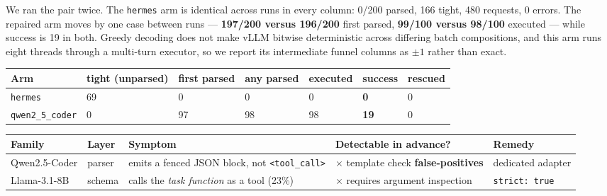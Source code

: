 We ran the pair twice. The \texttt{hermes} arm is identical across runs in every column: 0/200
parsed, 166 tight, 480 requests, 0 errors. The repaired arm moves by one case between runs ---
\textbf{197/200 versus 196/200} first parsed, \textbf{99/100 versus 98/100} executed --- while success is 19 in
both. Greedy decoding does not make vLLM bitwise deterministic across differing batch
compositions, and this arm runs eight threads through a multi-turn executor, so we report its
intermediate funnel columns as $\pm1$ rather than exact.

\begin{center}
\begin{minipage}{\linewidth}
\centering
\small
{}\label{tab:bfcl5}
\begin{tabular}{@{}lllllll@{}}
\toprule
Arm & tight (unparsed) & first parsed & any parsed & executed & \textbf{success} & rescued \\
\midrule
\texttt{hermes} & 69 & 0 & 0 & 0 & \textbf{0} & 0 \\
\texttt{qwen2\_5\_coder} & 0 & 97 & 98 & 98 & \textbf{19} & 0 \\
\bottomrule
\end{tabular}
\end{minipage}
\end{center}

\begin{center}
\begin{minipage}{\linewidth}
\centering
\small
{}\label{tab:taxonomy}
\begin{tabular}{@{}p{.14\linewidth}p{.10\linewidth}p{.25\linewidth}p{.22\linewidth}p{}@{}}
\toprule
Family & Layer & Symptom & Detectable in advance? & Remedy \\
\midrule
Qwen2.5-Coder & parser & emits a fenced JSON block, not \texttt{<tool\_call>}
  & $\times$ template check \textbf{false-positives} & dedicated adapter \\
Llama-3.1-8B & schema & calls the \emph{task function} as a tool (23\%)
  & $\times$ requires argument inspection & \texttt{strict: true} \\
\bottomrule
\end{tabular}
\end{minipage}
\end{center}

